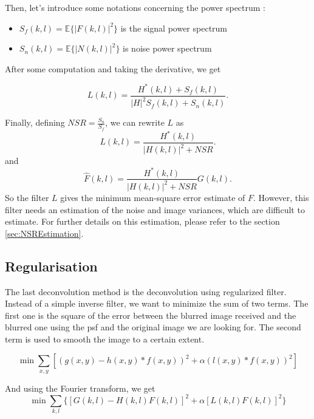 Then, let's introduce some notations concerning the power spectrum :
\begin{itemize}
\item $S_f(k,l) = \mathbb{E}\{|F(k,l)|^2\}$ is the signal power spectrum
\item $S_n(k,l) = \mathbb{E}\{|N(k,l)|^2\}$ is noise power spectrum 
\end{itemize}

After some computation and taking the derivative, we get

\begin{equation}
L(k,l)= \frac{H^*(k,l)+S_f(k,l)}{|H|^2 S_f(k,l) + S_n(k,l)}.
\label{eq:LsemiFinal}
\end{equation}

Finally, defining $NSR = \frac{S_n}{S_f}$, we can rewrite $L$ as 
\begin{equation}
L (k,l)= \frac{H^*(k,l)}{|H(k,l)|^2 + NSR}.
\end{equation}
and 
\begin{equation}
 \hat{F}(k,l) = \frac{H^*(k,l)}{|H(k,l)|^2 + NSR} G(k,l).
\end{equation}
So the filter $L$ gives the minimum mean-square error estimate of $F$.
However, this filter needs an estimation of the noise and image variances, which are difficult to estimate\cite{mathWorksWiener}. For further details on this estimation, please refer to the section \ref{sec:NSREstimation}.

\subsection{Regularisation}
\label{subsec:Reg}
The last deconvolution method is the deconvolution using regularized filter. 
Instead of a simple inverse filter, we want to minimize the sum of two terms. The first one is the square of the error between the blurred image received and the blurred one using the psf and the original image we are looking for. The second term is used to smooth the image to a certain extent. 

\begin{equation}
\min \sum_{x,y} \left[ (g(x,y) - h(x,y)*f(x,y))^2 + \alpha (l(x,y)*f(x,y))^2 \right]
\end{equation}

And using the Fourier transform, we get
\begin{equation}
\min \sum_{k,l} \{ [G(k,l) - H(k,l)F(k,l)]^2 + \alpha [L(k,l)F(k,l)]^2\}
\label{eq:FTreg}
\end{equation}

